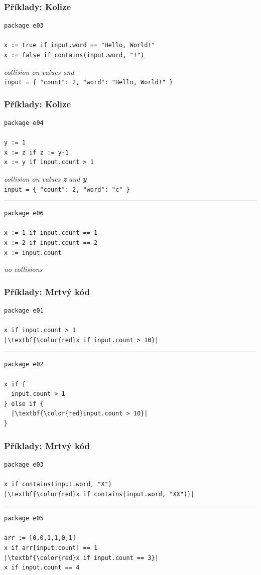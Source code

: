\begin{frame}[fragile]
  \frametitle{Příklady: Kolize}
\begin{lstlisting}[language=Rego, basicstyle=\ttfamily\small]
package e03

x := true if input.word == "Hello, World!"
x := false if contains(input.word, "!")
\end{lstlisting}
\textit{collision on values \true and \false} \\
\texttt{input = \{ "count": 2, "word": "Hello, World!" \}}
\end{frame}

\begin{frame}[fragile]
  \frametitle{Příklady: Kolize}
\begin{lstlisting}[language=Rego, basicstyle=\ttfamily\small]
package e04

y := 1
x := z if z := y-1
x := y if input.count > 1
\end{lstlisting}
\textit{collision on values \textbf{z} and \textbf{y}} \\
\texttt{input = \{ "count": 2, "word": "c" \}}
\noindent\rule{\linewidth}{0.4pt}

\begin{lstlisting}[language=Rego]
package e06

x := 1 if input.count == 1
x := 2 if input.count == 2
x := input.count
\end{lstlisting}
\textit{no collisions}
\end{frame}


\begin{frame}[fragile]
  \frametitle{Příklady: Mrtvý kód}
\begin{lstlisting}[language=Rego, escapechar=|]
package e01

x if input.count > 1
|\textbf{\color{red}x if input.count > 10}|
\end{lstlisting}

\noindent\rule{\linewidth}{0.4pt}
\begin{lstlisting}[language=Rego, escapechar=|]
package e02

x if {
  input.count > 1
} else if {
  |\textbf{\color{red}input.count > 10}|
}
\end{lstlisting}
\end{frame}

\begin{frame}[fragile]
  \frametitle{Příklady: Mrtvý kód}
\begin{lstlisting}[language=Rego, escapechar=|]
package e03

x if contains(input.word, "X")
|\textbf{\color{red}x if contains(input.word, "XX")}|
\end{lstlisting}

\noindent\rule{\linewidth}{0.4pt}
\begin{lstlisting}[language=Rego, escapechar=|]
package e05

arr := [0,0,1,1,0,1]
x if arr[input.count] == 1
|\textbf{\color{red}x if input.count == 3}|
x if input.count == 4
\end{lstlisting}
\end{frame}

